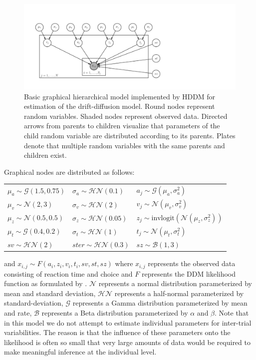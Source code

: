 \documentclass[letterpaper,10pt,english]{article}
\begin{document}
\begin{figure}[htbp]
\centering
\capstart
\includegraphics[scale=.7]{graphical_hddm.pdf}
\caption{Basic graphical hierarchical model implemented by HDDM for estimation of the drift-diffusion model. Round nodes represent random variables. Shaded nodes represent observed data. Directed arrows from parents to children visualize that parameters of the child random variable are distributed according to its   parents. Plates denote that multiple random variables with the same   parents and children exist.}
\label{fig.graphical}
\end{figure}

Graphical nodes are distributed as follows:\\
\begin{center}
\begin{tabular}{l|l|l}
$\mu_{a} \sim \mathcal{G}(1.5, 0.75)$ & $\sigma_{a} \sim \mathcal{HN}(0.1)$ & $a_{j} \sim \mathcal{G}(\mu_{a}, \sigma_{a}^2)$ \\
$\mu_{v} \sim \mathcal{N}(2, 3)$ & $\sigma_{v} \sim \mathcal{HN}(2)$ & $v_{j} \sim \mathcal{N}(\mu_{v}, \sigma_{v}^2)$ \\

$\mu_{z} \sim \mathcal{N}(0.5, 0.5)$ & $\sigma_{z} \sim \mathcal{HN}(0.05)$ & $z_{j} \sim \text{invlogit}(\mathcal{N}(\mu_{z}, \sigma_{z}^2))$ \\

$\mu_{t} \sim \mathcal{G}(0.4, 0.2)$ & $\sigma_{t} \sim \mathcal{HN}(1)$ & $t_{j} \sim \mathcal{N}(\mu_{t}, \sigma_{t}^2)$\\

$sv \sim \mathcal{HN}(2)$ & $ster \sim \mathcal{HN}(0.3)$ & $sz \sim \mathcal{B}(1, 3)$
\end{tabular}
\end{center}
and $x_{i, j} \sim F(a_{i}, z_{i}, v_{i}, t_{i}, sv, st, sz)$ where $x_{i, j}$ represents the observed data consisting of
reaction time and choice and $F$ represents the DDM likelihood
function as formulated by \citep{NavarroFuss09}. $\mathcal{N}$
represents a normal distribution parameterized by mean and standard
deviation, $\mathcal{HN}$ represents a half-normal parameterized by
standard-deviation, $\mathcal{G}$ represents a Gamma
distribution parameterized by mean and rate, $\mathcal{B}$
represents a Beta distribution parameterized by $\alpha$ and
$\beta$. Note that in this model we do not attempt to estimate
individual parameters for inter-trial variabilities. The reason is
that the influence of these parameters onto the likelihood is often so
small that very large amounts of data would be required to make
meaningful inference at the individual level.
\end{document}
